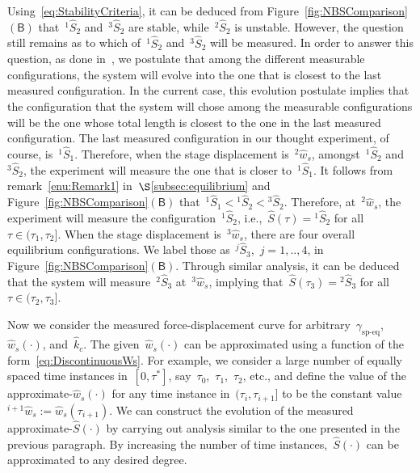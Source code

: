 \documentclass[preprint,10pt,times]{elsarticle}
\numberwithin{equation}{section}
\newcommand{\lsc}[2][\mathscr{l}]{{}^{ #1 }\! #2}
\newcommand{\pr}[1]{\left( #1 \right)}
\newcommand{\subf}[1]{\pr{\textsf{#1}}}
\begin{document}
Using~\eqref{eq:StabilityCriteria}, it can be deduced from Figure~\ref{fig:NBSComparison}$\subf{B}$
that~$\lsc[1]{\hat{S}}_2$ and~$\lsc[3]{\hat{S}}_2$ are stable,
while~$\lsc[2]{\hat{S}}_2$ is unstable. However, the question still
remains as to which of~$\lsc[1]{\hat{S}}_2$ and~$\lsc[3]{\hat{S}}_2$
will be measured. In order to answer this question, as done in~\cite{kesari2011effective},
we postulate that among the different measurable configurations, the
system will evolve into the one that is closest to the last measured
configuration. In the current case, this evolution postulate implies
that the configuration that the system will chose among the measurable
configurations will be the one whose total length is closest to the
one in the last measured configuration. The last measured configuration
in our thought experiment, of course, is~$\lsc[1]{\hat{S}}_1$. Therefore,
when the stage displacement is~$\lsc[2]{\hat{w}}_s$, amongst~$\lsc[1]{\hat{S}}_2$
and~$\lsc[3]{\hat{S}}_2$, the experiment will measure the one that
is closer to~$\lsc[1]{\hat{S}}_1$. It follows from remark{~\ref{enu:Remark1}} in~$\S$\ref{subsec:equilibrium}
and Figure~\ref{fig:NBSComparison}$\subf{B}$ that~$\lsc[1]{\hat{S}}_1<\lsc[1]{\hat{S}}_2<\lsc[3]{\hat{S}}_2$.
Therefore, at~$\lsc[2]{\hat{w}}_s$, the experiment will measure
the configuration~$\lsc[1]{\hat{S}}_2$, i.e.,~$\hat{S}\pr{\tau}=\lsc[1]{\hat{S}}_2$
for all~$\tau\in (\tau_1,\tau_2]$. When the stage displacement is~$\lsc[3]{\hat{w}}_s$,
there are four overall equilibrium configurations. We label those
as~$\lsc[j]{\hat{S}}_3$,~$j=1,..,4$, in Figure~\ref{fig:NBSComparison}$\subf{B}$.
Through similar analysis, it can be deduced that the system will
measure~$\lsc[2]{\hat{S}}_3$ at~$\lsc[3]{\hat{w}}_s$, implying
that~$\hat{S}\pr{\tau_3}=\lsc[2]{\hat{S}}_3$ for all~$\tau\in (\tau_2,\tau_3]$.

Now we consider the measured force-displacement curve for arbitrary~$\gamma_{\text{sp-eq}}$,~$\hat{w}_s(\cdot)$,
and~$\hat{k}_{c}$. The given~$\hat{w}_s(\cdot)$ can be approximated
using a function of the form~\eqref{eq:DiscontinuousWs}. For example,
we consider a large number of equally spaced time instances in~$[0,\tau^*]$,
say~$\tau_0$,~$\tau_1$,~$\tau_2$, etc., and define the value
of the approximate-$\hat{w}_s(\cdot)$ for any time instance in~$(\tau_i,\tau_{i+1}]$
to be the constant value~$\lsc[i+1]{\hat{w}}_s:=\hat{w}_s(\tau_{i+1})$.
We can construct the evolution of the measured approximate-$\hat{S}\pr{\cdot}$
by carrying out analysis similar to the one presented in the previous
paragraph. By increasing the number of time instances,~$\hat{S}(\cdot)$
can be approximated to any desired degree.
\end{document}
